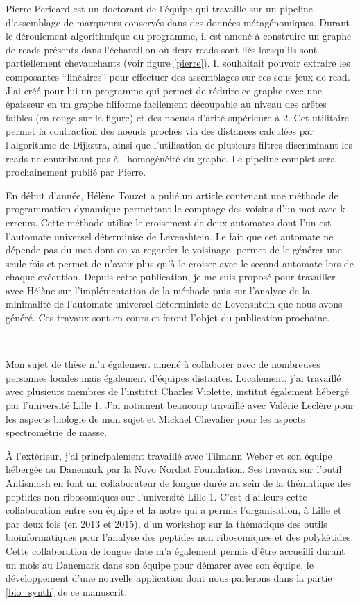 Pierre Pericard est un doctorant de l'équipe qui travaille sur un pipeline d'assemblage de marqueurs conservés dans des données métagénomiques.
Durant le déroulement algorithmique du programme, il est amené à construire un graphe de reads présents dans l'échantillon où deux reads sont liés lorsqu'ils sont partiellement chevauchants (voir figure \ref{pierre}).
Il souhaitait pouvoir extraire les composantes ``linéaires'' pour effectuer des assemblages sur ces sous-jeux de read.
J'ai créé pour lui un programme qui permet de réduire ce graphe avec une épaisseur en un graphe filiforme facilement découpable au niveau des arêtes faibles (en rouge sur la figure) et des noeuds d'arité supérieure à 2.
Cet utilitaire permet la contraction des noeuds proches via des distances calculées par l'algorithme de Dijkstra, ainsi que l'utilisation de plusieurs filtres discriminant les reads ne contribuant pas à l'homogénéité du graphe.
Le pipeline complet sera prochainement publié par Pierre.

En début d'année, Hélène Touzet a pulié un article contenant une méthode de programmation dynamique permettant le comptage des voisins d'un mot avec k erreurs.
Cette méthode utilise le croisement de deux automates dont l'un est l'automate universel déterminise de Levenshtein.
Le fait que cet automate ne dépende pas du mot dont on va regarder le voisinage, permet de le générer une seule fois et permet de n'avoir plus qu'à le croiser avec le second automate lors de chaque exécution.
Depuis cette publication, je me suis proposé pour travailler avec Hélène sur l'implémentation de la méthode puis sur l'analyse de la minimalité de l'automate universel déterministe de Levenshtein que nous avons généré.
Ces travaux sont en cours et feront l'objet du publication prochaine.

~~

Mon sujet de thèse m'a également amené à collaborer avec de nombreuses personnes locales mais également d'équipes distantes.
Localement, j'ai travaillé avec plusieurs membres de l'institut Charles Violette, institut également hébergé par l'université Lille 1.
J'ai notament beaucoup travaillé avec Valérie Leclère pour les aspects biologie de mon sujet et Mickael Chevalier pour les aspects spectrométrie de masse.

À l'extérieur, j'ai principalement travaillé avec Tilmann Weber et son équipe hébergée au Danemark par la Novo Nordist Foundation.
Ses travaux sur l'outil Antismash en font un collaborateur de longue durée au sein de la thématique des peptides non ribosomiques sur l'université Lille 1.
C'est d'ailleurs cette collaboration entre son équipe et la notre qui a permis l'organisation, à Lille et par deux fois (en 2013 et 2015), d'un workshop sur la thématique des outils bioinformatiques pour l'analyse des peptides non ribosomiques et des polykétides.
Cette collaboration de longue date m'a également permis d'être accueilli durant un mois au Danemark dans son équipe pour démarer avec son équipe, le développement d'une nouvelle application dont nous parlerons dans la partie \ref{bio_synth} de ce manuscrit.

